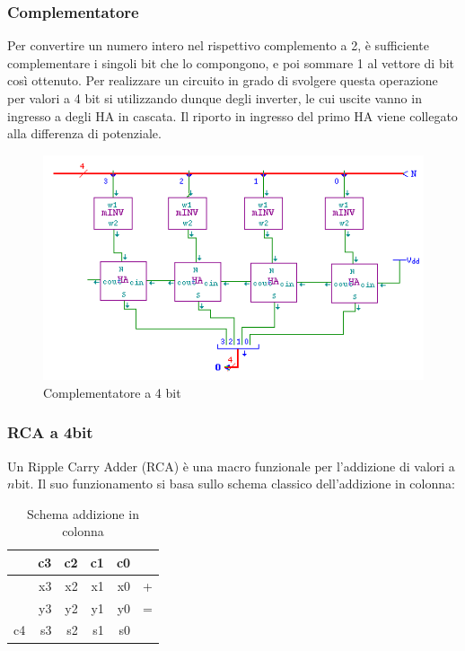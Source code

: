 \documentclass[10pt]{article}
\begin{document}
\begin{itemize}
\subsubsection{Complementatore}
Per convertire un numero intero nel rispettivo complemento a 2, è sufficiente complementare i singoli bit che lo compongono, e poi sommare 1 al vettore di bit così ottenuto.
Per realizzare un circuito in grado di svolgere questa operazione per valori a 4 bit si utilizzando dunque degli inverter, le cui uscite vanno in ingresso a degli HA in cascata.
Il riporto in ingresso del primo HA viene collegato alla differenza di potenziale.

\begin{figure}[H]
    \begin{minipage}[c]{\textwidth}
    \centering    
    \includegraphics[width=\textwidth]{complementoadue}
    \caption{Complementatore a 4 bit}
    \label{ }
    \end{minipage}
\end{figure}


\subsubsection{RCA a 4bit}
Un Ripple Carry Adder (RCA) è una macro funzionale per l'addizione di valori a $n$bit. Il suo funzionamento si basa sullo schema classico dell'addizione in colonna:

\begin{table}[H]
    \begin{minipage}[b]{\textwidth}
    \centering
    \begin{tabular}{rrrrrr}
       & \textbf{c3} & \textbf{c2} & \textbf{c1} & \textbf{c0} &   \\ \hline
       & x3          & x2          & x1          & x0          & + \\ 
       & y3          & y2          & y1          & y0          & = \\ \hline
    c4 & s3          & s2          & s1          & s0          &   \\
    \end{tabular}
    \caption{Schema addizione in colonna}
    \label{tab:my-table}
    \end{minipage}
\end{table}


\end{itemize}
\end{document}

